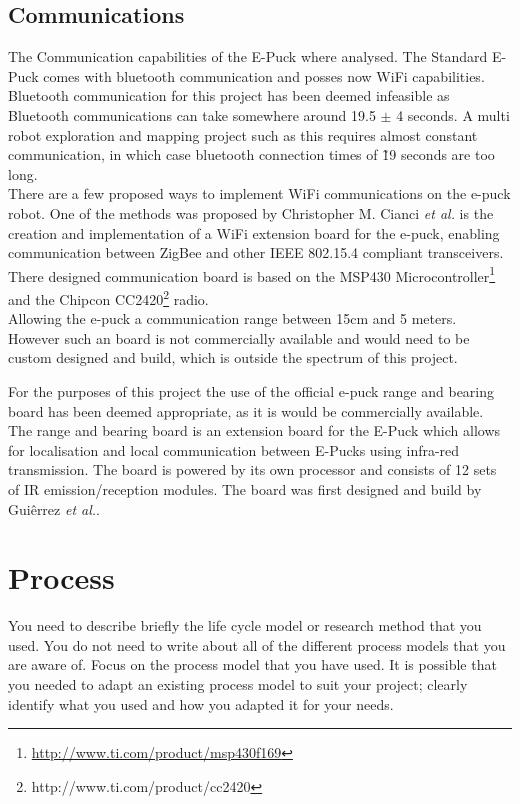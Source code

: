 \subsection{Communications}
The Communication capabilities of the E-Puck where analysed. The Standard E-Puck comes  with bluetooth communication and posses now WiFi capabilities. \\
Bluetooth  communication for this project has been deemed infeasible as Bluetooth communications can take somewhere around 19.5 $\pm$ 4 seconds. A multi robot exploration and mapping project such as this requires almost constant communication, in which case bluetooth connection times of \~19 seconds are too long.\\

There are a few proposed ways to implement WiFi communications on the e-puck robot. 
One of the methods was proposed by Christopher M. Cianci \textit{et al.}\cite{Cianci2007Communication} is the creation and implementation of a WiFi extension board for the e-puck, enabling communication between ZigBee and other IEEE 802.15.4 compliant transceivers. \\
There designed communication board is based on the MSP430 Microcontroller\footnote{\url{http://www.ti.com/product/msp430f169}} and the Chipcon CC2420\footnote{http://www.ti.com/product/cc2420} radio.\\
Allowing the e-puck a communication range between 15cm and 5 meters. \\
However such an board is not commercially available and would need to be custom designed and build, which is outside the spectrum of this project.

For the purposes of this project the use of the official e-puck range and bearing board has been deemed appropriate, as it is would be commercially available.\\
The range and bearing board is an extension board for the E-Puck which allows for localisation and local communication between E-Pucks using infra-red transmission. 
The board is powered by its own processor and consists of 12 sets of IR emission/reception modules. 
The board was first designed and build by Guiêrrez \textit{et al.}\cite{Gutierrez}. 

\section{Process}
You need to describe briefly the life cycle model or research method that you used. You do not need to write about all of the different process models that you are aware of. Focus on the process model that you have used. It is possible that you needed to adapt an existing process model to suit your project; clearly identify what you used and how you adapted it for your needs.\\



